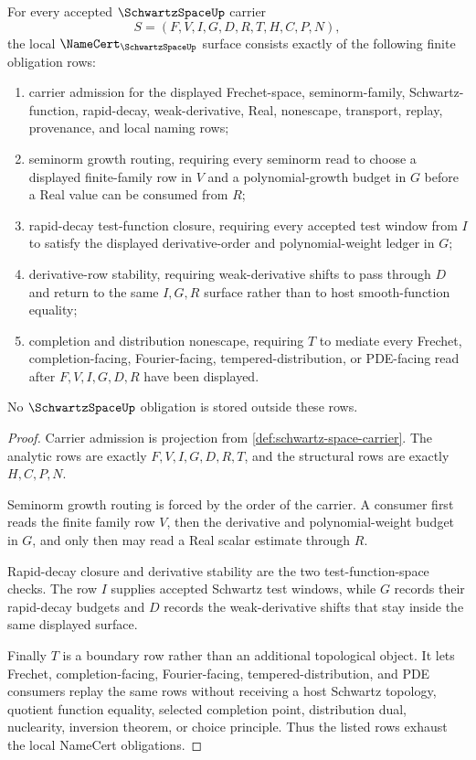 \begin{theorem}
\label{thm:schwartz-space-namecert-obligations}
For every accepted $\SchwartzSpaceUp$ carrier
$$
S=(F,V,I,G,D,R,T,H,C,P,N),
$$
the local $\NameCert_{\SchwartzSpaceUp}$ surface consists exactly of the following finite obligation rows:
\begin{enumerate}
\item carrier admission for the displayed Frechet-space, seminorm-family, Schwartz-function, rapid-decay, weak-derivative, Real, nonescape, transport, replay, provenance, and local naming rows;
\item seminorm growth routing, requiring every seminorm read to choose a displayed finite-family row in $V$ and a polynomial-growth budget in $G$ before a Real value can be consumed from $R$;
\item rapid-decay test-function closure, requiring every accepted test window from $I$ to satisfy the displayed derivative-order and polynomial-weight ledger in $G$;
\item derivative-row stability, requiring weak-derivative shifts to pass through $D$ and return to the same $I,G,R$ surface rather than to host smooth-function equality;
\item completion and distribution nonescape, requiring $T$ to mediate every Frechet, completion-facing, Fourier-facing, tempered-distribution, or PDE-facing read after $F,V,I,G,D,R$ have been displayed.
\end{enumerate}
No $\SchwartzSpaceUp$ obligation is stored outside these rows.
\end{theorem}
\begin{proof}
Carrier admission is projection from \autoref{def:schwartz-space-carrier}. The analytic rows are exactly $F,V,I,G,D,R,T$, and the structural rows are exactly $H,C,P,N$.

Seminorm growth routing is forced by the order of the carrier. A consumer first reads the finite family row $V$, then the derivative and polynomial-weight budget in $G$, and only then may read a Real scalar estimate through $R$.

Rapid-decay closure and derivative stability are the two test-function-space checks. The row $I$ supplies accepted Schwartz test windows, while $G$ records their rapid-decay budgets and $D$ records the weak-derivative shifts that stay inside the same displayed surface.

Finally $T$ is a boundary row rather than an additional topological object. It lets Frechet, completion-facing, Fourier-facing, tempered-distribution, and PDE consumers replay the same rows without receiving a host Schwartz topology, quotient function equality, selected completion point, distribution dual, nuclearity, inversion theorem, or choice principle. Thus the listed rows exhaust the local NameCert obligations.
\end{proof}

